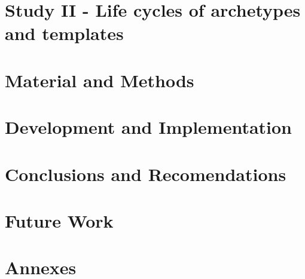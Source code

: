 \documentclass[a4paper, twoside, openright]{report}
\begin{document}
\chapter{Study II - Life cycles of archetypes and templates}


\chapter{Material and Methods}


\chapter{Development and Implementation}











\chapter{Conclusions and Recomendations}


\chapter{Future Work}





\chapter{Annexes}


\backCover{}
\end{document}
